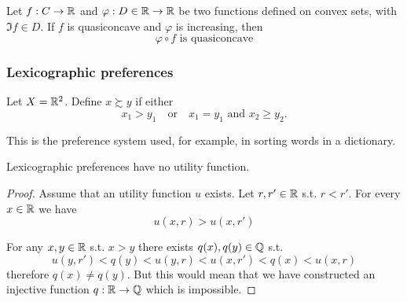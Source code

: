 \documentclass[12pt]{extarticle}
\begin{document}
\begin{proposition}{}{}
    Let $f: C \to \mathbb{R}$ and $\varphi: D \in \mathbb{R} \to \mathbb{R}$ be two functions defined on convex sets, with $\Im f \in D$.
    If $f$ is quasiconcave and $\varphi$ is increasing, then
    \begin{equation}
        \varphi \circ f \text{ is quasiconcave}
    \end{equation}
\end{proposition}

\subsubsection{Lexicographic preferences}

Let $X = \mathbb{R}^2$. Define $x \succsim y$ if either
\begin{equation}
    x_1 > y_1 \quad \text{or} \quad x_1 = y_1 \text{ and } x_2 \geq y_2.
\end{equation}

This is the preference system used, for example, in sorting words in a dictionary.

\begin{proposition}{}{}
    Lexicographic preferences have no utility function.
\end{proposition}

\begin{proof}
    Assume that an utility function $u$ exists.
    Let $r, r' \in \mathbb{R}$ s.t. $r < r'$.
    For every $x \in \mathbb{R}$ we have
    \begin{equation}
        u(x, r) > u(x, r')
    \end{equation}

    For any $x, y \in \mathbb{R}$ s.t. $x > y$ there exists $q(x), q(y) \in \mathbb{Q}$ s.t.
    \begin{equation}
        u(y, r') < q(y) < u(y, r) < u(x, r') < q(x) < u(x, r)
    \end{equation}
    therefore $q(x) \ne q(y)$.
    But this would mean that we have constructed an injective function $q : \mathbb{R} \to \mathbb{Q}$ which is impossible.
\end{proof}
\end{document}
